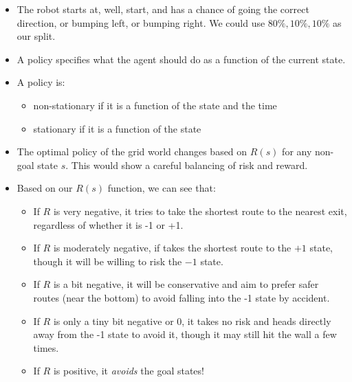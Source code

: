 \documentclass{article}
\begin{document}
\begin{itemize}
    \item The robot starts at, well, start, and has a chance of going the correct direction, or bumping left, or bumping right.  We could use $80\%, 10\%, 10\%$ as our split.
    \item A policy specifies what the agent should do as a function of the current state.
    \item A policy is:
        \begin{itemize}
            \item non-stationary if it is a function of the state and the time
            \item stationary if it is a function of the state
        \end{itemize}
    \item The optimal policy of the grid world changes based on $R(s)$ for any non-goal state $s$.  This would show a careful balancing of risk and reward.
    \item Based on our $R(s)$ function, we can see that:
        \begin{itemize}
            \item If $R$ is very negative, it tries to take the shortest route to the nearest exit, regardless of whether it is -1 or +1.
            \item If $R$ is moderately negative, if takes the shortest route to the $+1$ state, though it will be willing to risk the $-1$ state.
            \item If $R$ is a bit negative, it will be conservative and aim to prefer safer routes (near the bottom) to avoid falling into the -1 state by accident.
            \item If $R$ is only a tiny bit negative or 0, it takes no risk and heads directly away from the -1 state to avoid it, though it may still hit the wall a few times.
            \item If $R$ is positive, it \emph{avoids} the goal states!
        \end{itemize}
\end{itemize}
\end{document}
